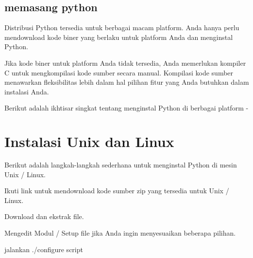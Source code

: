 {\subsection{memasang python}
\noindent 
{\fontsize{14pt}{14pt}\selectfont Distribusi Python tersedia untuk berbagai macam platform. Anda hanya perlu mendownload kode biner yang berlaku untuk platform Anda dan menginstal Python. \\} \par
\vspace{14pt}
\noindent 
{\fontsize{14pt}{14pt}\selectfont Jika kode biner untuk platform Anda tidak tersedia, Anda memerlukan kompiler C untuk mengkompilasi kode sumber secara manual. Kompilasi kode sumber menawarkan fleksibilitas lebih dalam hal pilihan fitur yang Anda butuhkan dalam instalasi Anda. \\} \par
\vspace{14pt}
\noindent 
{\fontsize{14pt}{14pt}\selectfont Berikut adalah ikhtisar singkat tentang menginstal Python di berbagai platform - \\} \par
\vspace{14pt}
\noindent 
{\fontsize{14pt}{14pt}\section {Instalasi Unix dan Linux }
\noindent 
{\fontsize{14pt}{14pt}\selectfont Berikut adalah langkah-langkah sederhana untuk menginstal Python di mesin Unix / Linux. \\} \par
\noindent 
{\fontsize{14pt}{14pt}\selectfont Ikuti link untuk mendownload kode sumber zip yang tersedia untuk Unix / Linux. \\} \par
\vspace{14pt}
\noindent 
{\fontsize{14pt}{14pt}\selectfont Download dan ekstrak file. \\} \par
\vspace{14pt}
\noindent 
{\fontsize{14pt}{14pt}\selectfont Mengedit Modul / Setup file jika Anda ingin menyesuaikan beberapa pilihan. \\} \par
\vspace{14pt}
\noindent 
{\fontsize{14pt}{14pt}\selectfont jalankan ./configure script \\} \par
\vspace{14pt}
}}
